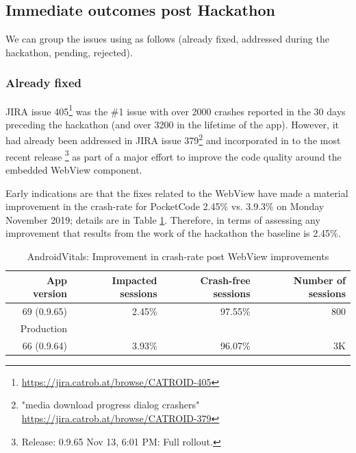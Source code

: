 \subsection{Immediate outcomes post Hackathon}
We can group the issues using as follows (already fixed, addressed during the hackathon, pending, rejected).

\subsubsection{Already fixed} JIRA issue 405\footnote{\url{https://jira.catrob.at/browse/CATROID-405}} was the \#1 issue with over 2000 crashes reported in the 30 days preceding the hackathon (and over 3200 in the lifetime of the app). However, it had already been addressed in JIRA issue 379\footnote{"media download progress dialog crashers" \url{https://jira.catrob.at/browse/CATROID-379}} and incorporated in to the most recent release \footnote{Release:
0.9.65 Nov 13, 6:01 PM: Full rollout.} as part of a major effort to improve the code quality around the embedded WebView component.

Early indications are that the fixes related to the WebView have made a material improvement in the crash-rate for PocketCode 2.45\% vs. 3.9.3\% on Monday  November 2019; details are in Table \ref{tab:androidvitals_rollout_of_0_9_65}. Therefore, in terms of assessing any improvement that results from the work of the hackathon the baseline is 2.45\%.

\begin{table}[htbp!]
    \centering
    \footnotesize
    \begin{tabular}{r|r|r|r}
        App version &Impacted sessions &Crash-free sessions &Number of sessions  \\
        \hline
        69 (0.9.65) &2.45\% &	97.55\% 	&~800 \\
        Production &&& \\
        \hline
        66 (0.9.64) &3.93\% &96.07\% 	&~3K
    \end{tabular}
    \caption{AndroidVitals: Improvement in crash-rate post WebView improvements}
    \label{tab:androidvitals_rollout_of_0_9_65}
\end{table}

